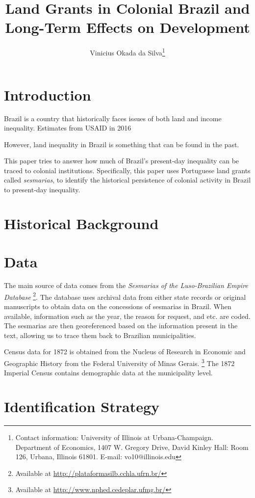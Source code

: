 \documentclass{article}
\title{Land Grants in Colonial Brazil and Long-Term Effects on Development}
\author{Vinicius Okada da Silva\thanks{Contact information: University of Illinois at Urbana-Champaign. Department of Economics, 1407 W. Gregory Drive, David Kinley Hall: Room 126, Urbana, Illinois 61801. E-mail: vo10@illinois.edu}}
\affil{Department of Economics, University of Illinois at Urbana-Champaign}
\date{}
\begin{document}
\maketitle

\clearpage
{} 

\section{Introduction}

Brazil is a country that historically faces issues of both land and income inequality. Estimates from USAID in 2016

However, land inequality in Brazil is something that can be found in the past.

This paper tries to answer how much of Brazil's present-day inequality can be traced to colonial institutions. Specifically, this paper uses Portuguese land grants called \textit{sesmarias}, to identify the historical persistence of colonial activity in Brazil to present-day inequality.

\section{Historical Background}

\section{Data}

The main source of data comes from the \textit{Sesmarias of the Luso-Brazilian Empire Database}
\footnote{
  Available at \url{http://plataformasilb.cchla.ufrn.br/}}.
The database uses archival data from either state records or original manuscripts to obtain data on the concessions of sesmarias in Brazil. 
When available, information such as the year, the reason for request, and etc. are coded. 
The sesmarias are then georeferenced based on the information present in the text, allowing us to trace them back to Brazilian municipalities.

Census data for 1872 is obtained from the Nucleus of Research in Economic and Geographic History from the Federal University of Minas Gerais.
\footnote{
  Available at \url{http://www.nphed.cedeplar.ufmg.br/}}
The 1872 Imperial Census contains demographic data at the municipality level.

\section{Identification Strategy}
\end{document}
